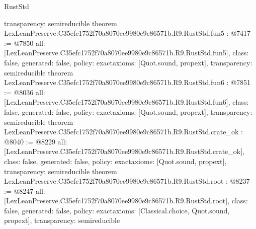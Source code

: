 \begin{lexlean}{RustStd}
\begin{coremodule}
{  transparency: semireducible
}
theorem LexLeanPreserve.C35efc1752f70a8070ee9980e9c86571b.R9.RustStd.fun5 : @7417 := @7850 {
  all: [LexLeanPreserve.C35efc1752f70a8070ee9980e9c86571b.R9.RustStd.fun5],
  class: false,
  generated: false,
  policy: exact{axioms: [Quot.sound, propext]},
  transparency: semireducible
}
theorem LexLeanPreserve.C35efc1752f70a8070ee9980e9c86571b.R9.RustStd.fun6 : @7851 := @8036 {
  all: [LexLeanPreserve.C35efc1752f70a8070ee9980e9c86571b.R9.RustStd.fun6],
  class: false,
  generated: false,
  policy: exact{axioms: [Quot.sound, propext]},
  transparency: semireducible
}
theorem LexLeanPreserve.C35efc1752f70a8070ee9980e9c86571b.R9.RustStd.crate_ok : @8040 := @8229 {
  all: [LexLeanPreserve.C35efc1752f70a8070ee9980e9c86571b.R9.RustStd.crate_ok],
  class: false,
  generated: false,
  policy: exact{axioms: [Quot.sound, propext]},
  transparency: semireducible
}
theorem LexLeanPreserve.C35efc1752f70a8070ee9980e9c86571b.R9.RustStd.root : @8237 := @8247 {
  all: [LexLeanPreserve.C35efc1752f70a8070ee9980e9c86571b.R9.RustStd.root],
  class: false,
  generated: false,
  policy: exact{axioms: [Classical.choice, Quot.sound, propext]},
  transparency: semireducible
}


\end{coremodule}
\end{lexlean}
